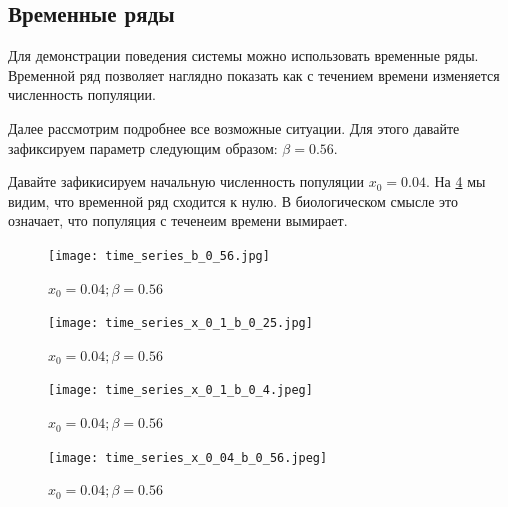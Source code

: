     \subsection{Временные ряды}

        Для демонстрации поведения системы можно использовать временные ряды. Временной ряд позволяет наглядно показать как с течением времени изменяется численность популяции.

        Далее рассмотрим подробнее все возможные ситуации. Для этого давайте зафиксируем параметр следующим образом: \(\beta = 0.56\). 

        Давайте зафикисируем начальную численность популяции \(x_0 = 0.04\). На \ref{time_series_x_0_04_b_0_56} мы видим, что временной ряд сходится к нулю. В биологическом смысле это означает, что популяция с теченеим времени вымирает.
    
        \begin{figure}
            \centering
            \texttt{[image: time\_series\_b\_0\_56.jpg]}

            \captionsetup{justification=centering}
            \caption{\(x_0 = 0.04; \beta = 0.56\)}
            \label{time_series_x_0_04_b_0_56}
        \end{figure}
    
        \begin{figure}
            \centering
            \texttt{[image: time\_series\_x\_0\_1\_b\_0\_25.jpg]}

            \captionsetup{justification=centering}
            \caption{\(x_0 = 0.04; \beta = 0.56\)}
            \label{time_series_x_0_04_b_0_56}
        \end{figure}
    
        \begin{figure}
            \centering
            \texttt{[image: time\_series\_x\_0\_1\_b\_0\_4.jpeg]}

            \captionsetup{justification=centering}
            \caption{\(x_0 = 0.04; \beta = 0.56\)}
            \label{time_series_x_0_04_b_0_56}
        \end{figure}
    
        \begin{figure}
            \centering
            \texttt{[image: time\_series\_x\_0\_04\_b\_0\_56.jpeg]}

            \captionsetup{justification=centering}
            \caption{\(x_0 = 0.04; \beta = 0.56\)}
            \label{time_series_x_0_04_b_0_56}
        \end{figure}

